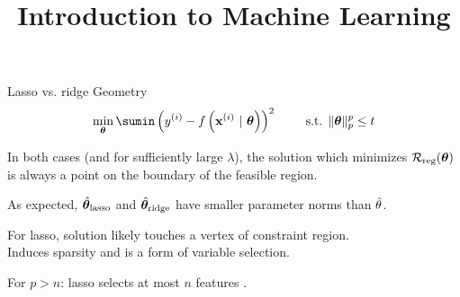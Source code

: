 \documentclass[11pt,compress,t,notes=noshow, xcolor=table]{beamer}
\title{Introduction to Machine Learning}
\begin{document}


\begin{vbframe}{Lasso vs. ridge Geometry}
$$ 
  \min_{\thetav} \sumin \left(\yi - \fxit\right)^2 \qquad \text{ s.t. } \|\thetav\|_p^p  \leq t 
$$ 
  \vspace{-0.5cm}
  \begin{figure}
    \centering
  \end{figure}

  \begin{itemize}
    \item \small{In both cases (and for sufficiently large $\lambda$), the solution which minimizes $\mathcal{R}_{\text{reg}}(\bm{\theta})$ is always a point on the boundary of the feasible region.
    \item As expected, $\hat{\bm{\theta}}_{\text{lasso}}$ and $\hat{\bm{\theta}}_{\text{ridge}}$ have smaller parameter norms than $\hat{\theta}$.}
    \item For lasso, solution likely touches a vertex of constraint region. \\
        Induces sparsity and is a form of variable selection.
    \item For $p>n$: lasso selects at most $n$ features .
    
  \end{itemize}
  
\end{vbframe}
\end{document}
